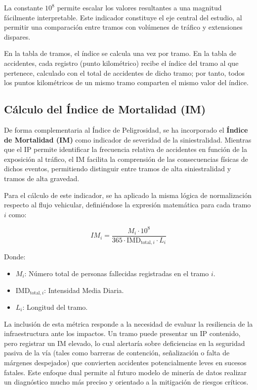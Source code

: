 \documentclass[twoside,a4paper,12pt,onecolumn,openany]{book}
\begin{document}
La constante $10^8$ permite escalar los valores resultantes a una magnitud fácilmente interpretable. Este indicador constituye el eje central del estudio, al permitir una comparación entre tramos con volúmenes de tráfico y extensiones dispares.

\vspace{0,5cm}

En la tabla de tramos, el índice se calcula una vez por tramo. En la tabla de accidentes, cada registro (punto kilométrico) recibe el índice del tramo al que pertenece, calculado con el total de accidentes de dicho tramo; por tanto, todos los puntos kilométricos de un mismo tramo comparten el mismo valor del índice.

\subsection{Cálculo del Índice de Mortalidad (IM)}

De forma complementaria al Índice de Peligrosidad, se ha incorporado el \textbf{Índice de Mortalidad (IM)} como indicador de severidad de la siniestralidad. Mientras que el IP permite identificar la frecuencia relativa de accidentes en función de la exposición al tráfico, el IM facilita la comprensión de las consecuencias físicas de dichos eventos, permitiendo distinguir entre tramos de alta siniestralidad y tramos de alta gravedad.

\vspace{0,5cm}

Para el cálculo de este indicador, se ha aplicado la misma lógica de normalización respecto al flujo vehicular, definiéndose la expresión matemática para cada tramo $i$ como:

$$IM_i = \frac{M_i \cdot 10^8}{365 \cdot \text{IMD}_{\text{total},i} \cdot L_i}$$

Donde:
\begin{itemize}
    \item $M_i$: Número total de personas fallecidas registradas en el tramo $i$.
    \item $\text{IMD}_{\text{total},i}$: Intensidad Media Diaria.
    \item $L_i$: Longitud del tramo.
\end{itemize}

La inclusión de esta métrica responde a la necesidad de evaluar la resiliencia de la infraestructura ante los impactos. Un tramo puede presentar un IP contenido, pero registrar un IM elevado, lo cual alertaría sobre deficiencias en la seguridad pasiva de la vía (tales como barreras de contención, señalización o falta de márgenes despejados) que convierten accidentes potencialmente leves en sucesos fatales. Este enfoque dual permite al futuro modelo de minería de datos realizar un diagnóstico mucho más preciso y orientado a la mitigación de riesgos críticos.
\end{document}
